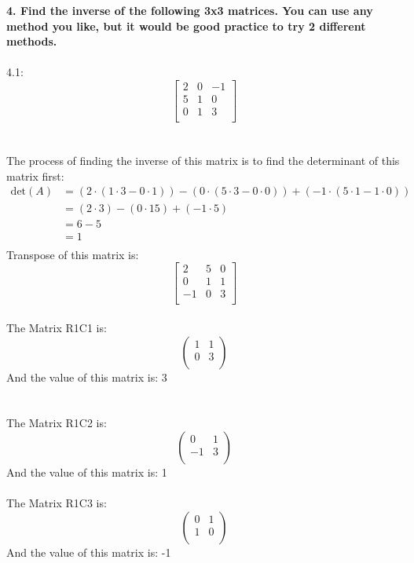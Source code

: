 \documentclass[a4paper,12pt]{article} %
\begin{document}
\noindent
\textbf{4. Find the inverse of the following 3x3 matrices. You can use any method you like, but it would be good practice to try 2 different methods.} \\
\\ 4.1: \\
\[
\begin{bmatrix}
    2 & 0 & -1 \\
    5 & 1 & 0 \\
    0 & 1 & 3 \\
\end{bmatrix}
\] \\
\\
The process of finding the inverse of this matrix is to find the determinant of this matrix first: \\
\begin{align*}
\text{det}(A) &= (2 \cdot (1 \cdot 3 - 0 \cdot 1)) - (0 \cdot (5 \cdot 3 - 0 \cdot 0)) + (-1 \cdot (5 \cdot 1 - 1 \cdot 0)) \\
&= (2 \cdot 3) - (0 \cdot 15) + (-1 \cdot 5) \\
&= 6 - 5 \\
&= 1 \\
\end{align*}
\noindent
Transpose of this matrix is: \\
\[
\begin{bmatrix}
    2 & 5 & 0 \\
    0 & 1 & 1 \\
    -1 & 0 & 3 \\
\end{bmatrix}
\]
\\
\noindent
The Matrix R1C1 is:
\[
\begin{pmatrix}
    1 & 1 \\
    0 & 3 \\
\end{pmatrix}
\]
And the value of this matrix is: 3 \\\\
\\
\noindent
The Matrix R1C2 is:
\[
\begin{pmatrix}
    0 & 1 \\
    -1 & 3 \\
\end{pmatrix}
\]
And the value of this matrix is: 1 \\\\
\noindent
The Matrix R1C3 is:
\[
\begin{pmatrix}
    0 & 1 \\
    1 & 0 \\
\end{pmatrix}
\]
And the value of this matrix is: -1 \\\\
\end{document}
